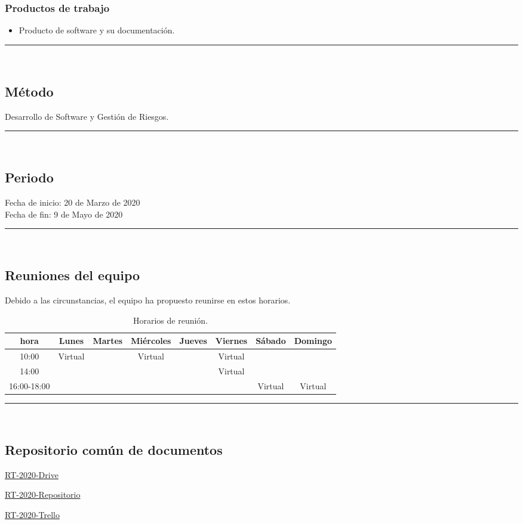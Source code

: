 \documentclass{article}
\begin{document}
\subsubsection*{Productos de trabajo}
\begin{itemize}
\item Producto de software y su documentación.
\end{itemize}

\rule{0.8\textwidth}{.8pt}\\

\subsection*{Método} Desarrollo de Software y Gestión de Riesgos.


\rule{0.8\textwidth}{.8pt}\\

\subsection*{Periodo}
Fecha de inicio: 20 de Marzo de 2020\\
\indent Fecha de fin: 9 de Mayo de 2020\\

\rule{0.8\textwidth}{.8pt}\\

\subsection*{Reuniones del equipo}

Debido a las circunstancias, el equipo ha propuesto reunirse en estos horarios.
\begin{center}
  \begin{table}[H]
    \centering
    \begin{tabular}{| c | c | c | c | c | c | c | c | }
      \hline
      hora & Lunes & Martes & Miércoles & Jueves & Viernes & Sábado & Domingo \\
      \hline
      10:00 & Virtual & & Virtual & & Virtual & & \\ \hline
      14:00 & & & & & Virtual & & \\ \hline
      16:00-18:00 & & & & &  & Virtual & Virtual\\ \hline    
    \end{tabular}
    \caption{Horarios de reunión.}
    \label{tabla:horarios}
  \end{table}
\end{center}

\rule{0.8\textwidth}{.8pt}\\

\subsection*{Repositorio común de documentos}
\href{https://drive.google.com/open?id=13f9jp3Oli6AQF1Ap8VhoEKFXTPULumos}{RT-2020-Drive}

\href{https://github.com/mildewyPrawn/CafeCiencias}{RT-2020-Repositorio}

\href{https://trello.com/b/rwdAGuSi/cafeciencias}{RT-2020-Trello}
\end{document}
